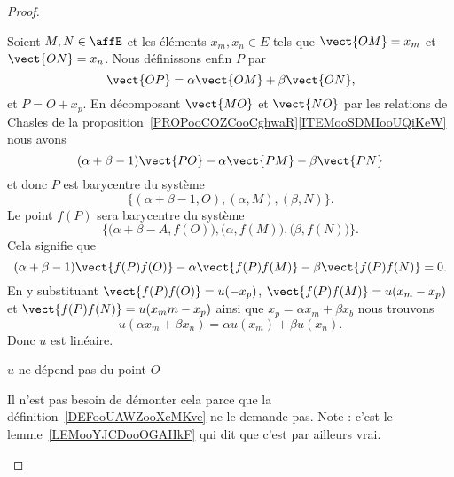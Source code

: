 \begin{proof}
\begin{subproof}
\begin{subproof}
                Soient \( M,N\in\affE\) et les éléments \( x_m,x_n\in E\) tels que \( \vect{ OM }=x_m\) et \( \vect{ ON }=x_n\). Nous définissons enfin \( P\) par
                \begin{equation}
                    \vect{ OP }=\alpha \vect{ OM }+\beta\vect{ ON },
                \end{equation}
                et \( P=O+x_p\). En décomposant \( \vect{ MO }\) et \( \vect{ NO }\) par les relations de Chasles de la proposition~\ref{PROPooCOZCooCghwaR}\ref{ITEMooSDMIooUQiKeW} nous avons
                \begin{equation}
                    (\alpha+\beta-1)\vect{ PO }-\alpha\vect{ PM }-\beta\vect{ PN }
                \end{equation}
                et donc \( P\) est barycentre du système
                \begin{equation}
                    \big\{ (\alpha+\beta-1,O),(\alpha,M),(\beta,N) \}.
                \end{equation}
                Le point \( f(P)\) sera barycentre du système
                \begin{equation}
                    \Big\{ \big( \alpha+\beta-A,f(O) \big),\big( \alpha,f(M) \big), \big( \beta,f(N) \big) \}.
                \end{equation}
                Cela signifie que
                \begin{equation}
                    (\alpha+\beta-1)\vect{ f(P)f(O) }-\alpha\vect{ f(P)f(M) }-\beta\vect{ f(P)f(N) }=0.
                \end{equation}
                En y substituant \( \vect{ f(P)f(O) }=u(-x_p)\), \( \vect{ f(P)f(M) }=u(x_m-x_p)\) et \( \vect{ f(P)f(N) }=u(x_mm-x_p)\) ainsi que \( x_p=\alpha x_m+\beta x_b\) nous trouvons
                \begin{equation}
                    u(\alpha x_m+\beta x_n)=\alpha u(x_m)+\beta u(x_n).
                \end{equation}
                Donc \( u\) est linéaire.

            \item[\( u\) ne dépend pas du point \( O\)]

                Il n'est pas besoin de démonter cela parce que la définition~\ref{DEFooUAWZooXcMKve} ne le demande pas. Note : c'est le lemme~\ref{LEMooYJCDooOGAHkF} qui dit que c'est par ailleurs vrai.
            \end{subproof}
    \end{subproof}
\end{proof}

